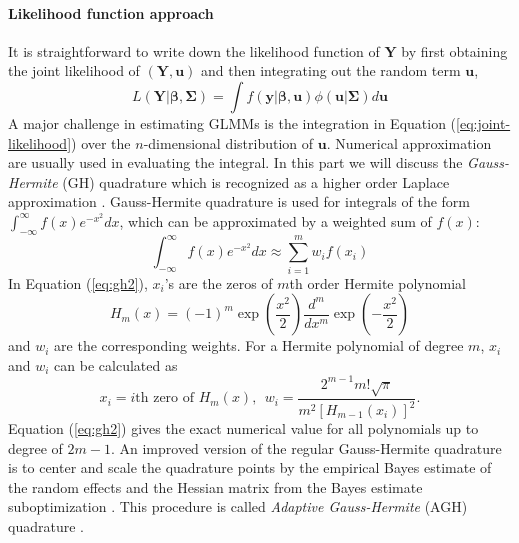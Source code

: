 \paragraph{Likelihood function approach}\label{para:likelihood-approach}
It is straightforward  to write down the likelihood function of $\bm Y$ by first obtaining the
joint likelihood of $(\bm Y, \bm u)$ and then integrating out the random term $\bm u$,
\begin{equation}\label{eq:joint-likelihood}
	L(\bm Y|\bm\beta, \bm \Sigma) = \int f(\bm y|\bm \beta, \bm u)\phi(\bm u|\bm \Sigma)d \bm u
\end{equation}
A major challenge in estimating GLMMs is the integration in Equation (\ref{eq:joint-likelihood})
over the $n$-dimensional distribution of $\bm u$. Numerical approximation are usually used in
evaluating the integral. In this part we will discuss the \textit{Gauss-Hermite} (GH) quadrature
which is recognized as a higher order Laplace approximation \citep{liu1994note}.
Gauss-Hermite quadrature is used for integrals of the form 
$\int_{-\infty}^{\infty}f(x) e^{-x^2}dx$, which can be approximated by a weighted sum of  $f(x)$:
\begin{equation}\label{eq:gh2}
	\int_{-\infty}^{\infty}f(x) e^{-x^2}dx \approx \sum_{i=1}^m w_if(x_i)
\end{equation}
In Equation (\ref{eq:gh2}), $x_i$'s are the zeros of $m$th order Hermite polynomial 
\[H_m(x) = (-1)^m\exp(\dfrac{x^2}{2})\frac{d^m}{dx^m}\exp(-\dfrac{x^2}{2})\]
and $w_i$ are the corresponding weights. For a Hermite polynomial of degree $m$, $x_i$ and $w_i$
can be calculated as 	
\begin{equation}\label{eq:gh3}
	x_i = i\text{th zero of } H_m(x),~~  w_i = \frac{2^{m-1}m!\sqrt{\pi}}{m^2[H_{m-1}(x_i)]^2}. 
\end{equation}
Equation (\ref{eq:gh2}) gives the exact numerical value for all polynomials up to degree of
$2m-1$. 
An improved version of the regular Gauss-Hermite quadrature is to center and scale the quadrature
points  by the empirical Bayes estimate of the random effects and the Hessian matrix from the Bayes
estimate suboptimization \citep{liu1994note}. This procedure is called \textit{Adaptive
	Gauss-Hermite} (AGH) quadrature \citep{pinheiro1995approximations}. %

